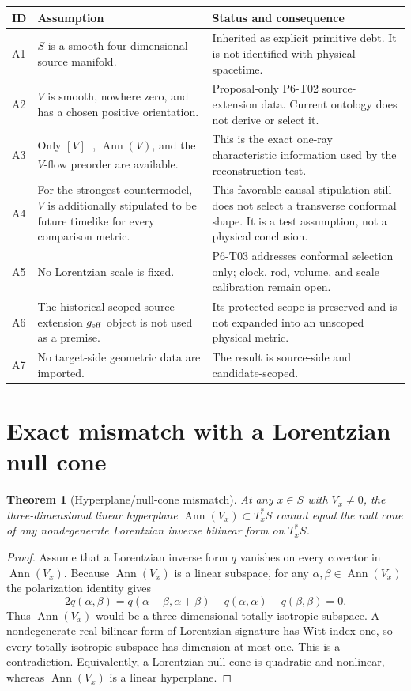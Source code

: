 \documentclass[11pt]{article}
\newtheorem{theorem}{Theorem}
\newcommand{\Ann}{\operatorname{Ann}}
\begin{document}
\begin{longtable}{>{\raggedright\arraybackslash}p{}
                  >{\raggedright\arraybackslash}p{}
                  >{\raggedright\arraybackslash}p{}}
\toprule
ID & Assumption & Status and consequence\\
\midrule
\endhead
A1 & \(S\) is a smooth four-dimensional source manifold. &
Inherited as explicit primitive debt.  It is not identified with physical
spacetime.\\
A2 & \(V\) is smooth, nowhere zero, and has a chosen positive orientation. &
Proposal-only P6-T02 source-extension data.  Current ontology does not derive
or select it.\\
A3 & Only \([V]_+\), \(\Ann(V)\), and the \(V\)-flow preorder are available. &
This is the exact one-ray characteristic information used by the
reconstruction test.\\
A4 & For the strongest countermodel, \(V\) is additionally stipulated to be
future timelike for every comparison metric. &
This favorable causal stipulation still does not select a transverse
conformal shape.  It is a test assumption, not a physical conclusion.\\
A5 & No Lorentzian scale is fixed. &
P6-T03 addresses conformal selection only; clock, rod, volume, and scale
calibration remain open.\\
A6 & The historical scoped source-extension \(g_{\rm eff}\) object is not
used as a premise. &
Its protected scope is preserved and is not expanded into an unscoped
physical metric.\\
A7 & No target-side geometric data are imported. &
The result is source-side and candidate-scoped.\\
\bottomrule
\end{longtable}

\section{Exact mismatch with a Lorentzian null cone}

\begin{theorem}[Hyperplane/null-cone mismatch]
\label{thm:hyperplane}
At any \(x\in S\) with \(V_x\neq0\), the three-dimensional linear hyperplane
\(\Ann(V_x)\subset T_x^*S\) cannot equal the null cone of any nondegenerate
Lorentzian inverse bilinear form on \(T_x^*S\).
\end{theorem}

\begin{proof}
Assume that a Lorentzian inverse form \(q\) vanishes on every covector in
\(\Ann(V_x)\).  Because \(\Ann(V_x)\) is a linear subspace, for any
\(\alpha,\beta\in\Ann(V_x)\) the polarization identity gives
\[
  2q(\alpha,\beta)
  =q(\alpha+\beta,\alpha+\beta)-q(\alpha,\alpha)-q(\beta,\beta)=0.
\]
Thus \(\Ann(V_x)\) would be a three-dimensional totally isotropic subspace.
A nondegenerate real bilinear form of Lorentzian signature has Witt index one,
so every totally isotropic subspace has dimension at most one.  This is a
contradiction.  Equivalently, a Lorentzian null cone is quadratic and
nonlinear, whereas \(\Ann(V_x)\) is a linear hyperplane.
\end{proof}
\end{document}
